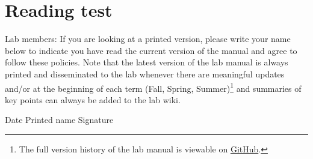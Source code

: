 \documentclass[letterpaper,12pt,oneside]{memoir}
\begin{document}
\chapter*{Reading test}
\noindent Lab members: If you are looking at a printed version, please write your name below to indicate you have read the current version of the manual and agree to follow these policies. Note that the latest version of the lab manual is always printed and disseminated to the lab whenever there are meaningful updates and/or at the beginning of each term (Fall, Spring, Summer)\footnote{The full version history of the lab manual is viewable on \href{https://github.com/DVSneuro/smithlab_manual}{GitHub}.} and summaries of key points can always be added to the lab wiki.

\vspace{,5in}

\noindent Date \hspace{.5in} Printed name \hspace{1.5in} Signature\\
\end{document}

